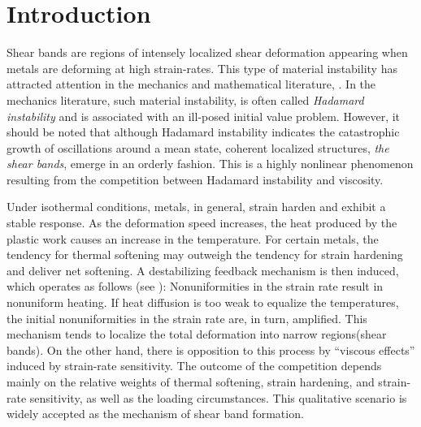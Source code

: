 \documentclass[graybox]{svmult}
\begin{document}
\section{Introduction}
Shear bands are regions of intensely localized shear deformation appearing when metals are deforming at high strain-rates.  This type of material instability has attracted attention in the mechanics and mathematical literature, \cite{FM87,SC89,ZH_1944,dafermos_adiabatic_1983,Tz_1986,tzavaras_nonlinear_1992}. In the mechanics literature, such material instability,  is
often called \emph{Hadamard instability} and is associated with an ill-posed initial value problem. However, it should be noted that although Hadamard instability indicates the catastrophic growth of oscillations around a mean state, coherent localized structures, \emph{the shear bands}, emerge in an orderly fashion. This is a highly nonlinear phenomenon resulting from the competition between Hadamard instability and viscosity. 


Under isothermal conditions, metals, in general, strain harden and exhibit a stable response. As the deformation speed increases, the heat produced by the plastic work causes an increase in the temperature. For certain metals, the tendency for thermal softening may outweigh the tendency for strain hardening and deliver net softening. A destabilizing feedback mechanism is then induced, which operates as follows (see \cite{CDHS}): Nonuniformities in the strain rate result in nonuniform heating. If heat diffusion is too weak to equalize the temperatures, the initial nonuniformities in the strain rate are, in turn, amplified. This mechanism tends to localize the total deformation into narrow regions(shear bands). On the other hand, there is opposition to this process by ``viscous effects'' induced by strain-rate sensitivity. The outcome of the competition depends mainly on the relative weights of thermal softening, strain hardening, and strain-rate sensitivity, as well as the loading circumstances. This qualitative scenario is widely accepted as the mechanism of shear band formation. 
\end{document}
